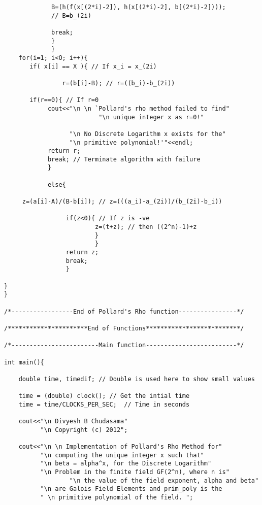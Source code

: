\documentclass[iwp,first]{luthesis}
\begin{document}
\begin{verbatim}
             B=(h(f(x[(2*i)-2]), h(x[(2*i)-2], b[(2*i)-2]))); 
             // B=b_(2i)
             
             break;
             }
             }
    for(i=1; i<O; i++){     
       if( x[i] == X ){ // If x_i = x_(2i)
                   
                r=(b[i]-B); // r=((b_i)-b_(2i))
                
       if(r==0){ // If r=0
            cout<<"\n \n `Pollard's rho method failed to find" 
		                  "\n unique integer x as r=0!"

                  "\n No Discrete Logarithm x exists for the" 
                  "\n primitive polynomial!'"<<endl;
            return r;
            break; // Terminate algorithm with failure
            }

            else{
                  
     z=(a[i]-A)/(B-b[i]); // z=(((a_i)-a_(2i))/(b_(2i)-b_i))
              
                 if(z<0){ // If z is -ve
                         z=(t+z); // then ((2^n)-1)+z
                         }
                         }
                 return z;
                 break;
                 }
                 
}
}

/*-----------------End of Pollard's Rho function----------------*/

/**********************End of Functions**************************/

/*------------------------Main function-------------------------*/

int main(){
    
    double time, timedif; // Double is used here to show small values

    time = (double) clock(); // Get the intial time
    time = time/CLOCKS_PER_SEC;  // Time in seconds 
    
    cout<<"\n Divyesh B Chudasama"
          "\n Copyright (c) 2012";
    
    cout<<"\n \n Implementation of Pollard's Rho Method for" 
          "\n computing the unique integer x such that" 
          "\n beta = alpha^x, for the Discrete Logarithm" 
          "\n Problem in the finite field GF(2^n), where n is" 
		          "\n the value of the field exponent, alpha and beta" 
          "\n are Galois Field Elements and prim_poly is the 
          " \n primitive polynomial of the field. ";
       

\end{verbatim}
\end{document}
